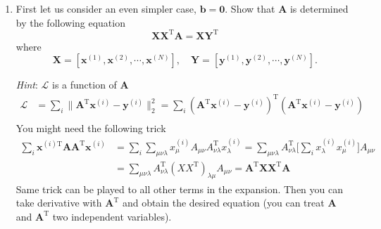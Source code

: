 \documentclass[a4paper,twoside, 10pt]{article}
\theoremstyle{wick}
\newcommand{\tr}{\textrm}
\newcommand{\mat}[1]{\mathbf{#1}}
\begin{document}
	\begin{enumerate}
		\item First let us consider an even simpler case, $\bm{b} = \bm{0}$. Show that $\mat{A}$ is determined by the following equation
		\begin{equation}	\label{eq:lls_equation}
			\mat{X} \mat{X}^{\tr{T}} \mat{A}
				= \mat{X} \mat{Y}^{\tr{T}}
		\end{equation}
		where
		\begin{equation}	\label{eq:data_set_def}
			\mat{X}
				= [\bm{x}^{(1)}, \bm{x}^{(2)}, \cdots{}, \bm{x}^{(N)}],\quad{}
			\mat{Y}
				= [\bm{y}^{(1)}, \bm{y}^{(2)}, \cdots{}, \bm{y}^{(N)}].
		\end{equation}

		\textit{Hint}: $\mathcal{L}$ is a function of $\mat{A}$
		\begin{equation}	\label{eq:lsloss}
		\begin{split}
			\mathcal{L}
				&= \sum_i \| \mat{A}^{\tr{T}} \bm{x}^{(i)} - \bm{y}^{(i)} \|^2_2
				= \sum_i (\mat{A}^{\tr{T}} \bm{x}^{(i)} - \bm{y}^{(i)})^{\tr{T}}
				(\mat{A}^{\tr{T}} \bm{x}^{(i)} - \bm{y}^{(i)})	\\
				\iffalse
				&= \mat{A}^{\tr{T}} \bigg[\sum_{i} \bm{x}^{(i)} \bm{x}^{(i)\tr{T}}\bigg] \mat{A}
				- \mat{A}^{\tr{T}} \bigg[\sum_{i} \bm{x}^{(i)} \bm{y}^{(i)\tr{T}}\bigg]
				- \bigg[\sum_{i} \bm{y}^{(i)} \bm{x}^{(i)\tr{T}} \bigg] \mat{A}
				+ \sum_i \bm{y}^{(i)\tr{T}} \bm{y}^{(i)}
				\fi
		\end{split}
		\end{equation}
		You might need the following trick
		\begin{equation}
		\begin{split}
			\sum_i \bm{x}^{(i)\tr{T}} \mat{A} \mat{A}^{\tr{T}} \bm{x}^{(i)}
				&= \sum_i \sum_{\mu\nu\lambda} x^{(i)}_{\mu} A_{\mu\nu}
				A^{\tr{T}}_{\nu\lambda} x^{(i)}_{\lambda}
				= \sum_{\mu\nu\lambda} A^{\tr{T}}_{\nu\lambda} \bigg[\sum_i x^{(i)}_{\lambda}
				x^{(i)}_{\mu}\bigg] A_{\mu\nu}	\\
				&= \sum_{\mu\nu\lambda} A^{\tr{T}}_{\nu\lambda} (XX^{\tr{T}})_{\lambda \mu} A_{\mu\nu}
				= \mat{A}^{\tr{T}} \mat{X} \mat{X}^{\tr{T}} \mat{A}
		\end{split}
		\end{equation}
		Same trick can be played to all other terms in the expansion. Then you can take derivative with $\mat{A}^{\tr{T}}$ and obtain the desired equation (you can treat $\mat{A}$ and $\mat{A}^{\tr{T}}$ two independent variables).


\end{enumerate}
\end{document}
